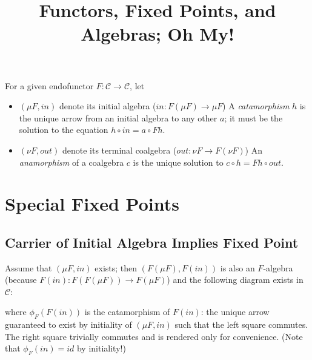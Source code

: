 \documentclass[letterpaper]{article}
\title{Functors, Fixed Points, and Algebras; Oh My!}
\begin{document}
\maketitle

For a given endofunctor $F : \mathcal{C} \to \mathcal{C}$, let
%
\begin{itemize}
%
  \item $(\mu F, in)$ denote its initial algebra ($in : F(\mu F) \to \mu F$)
  A {\em catamorphism} $h$ is the unique arrow from an initial algebra to
  any other $a$; it must be the solution to the equation $h \circ in = a
  \circ F h$.
%
  \item $(\nu F, out)$ denote its terminal coalgebra ($out : \nu F \to F(\nu
  F)$) An {\em anamorphism} of a coalgebra $c$ is the unique solution to $c
  \circ h = F h \circ out$.
%
\end{itemize}


\section{Special Fixed Points}

\subsection{Carrier of Initial Algebra Implies Fixed Point}

Assume that $(\mu F, in)$ exists; then $(F(\mu F), F(in))$ is also an
$F$-algebra (because $F(in) : F(F(\mu F)) \to F(\mu F)$) and the following
diagram exists in $\mathcal{C}$:
%
\begin{center}\end{center}
%
where $\phi_F(F(in))$ is the catamorphism of $F(in)$: the unique arrow
guaranteed to exist by initiality of $(\mu F, in)$ such that the left square
commutes.  The right square trivially commutes and is rendered only for
convenience.  (Note that $\phi_F(in) = id$ by initiality!)
\end{document}
